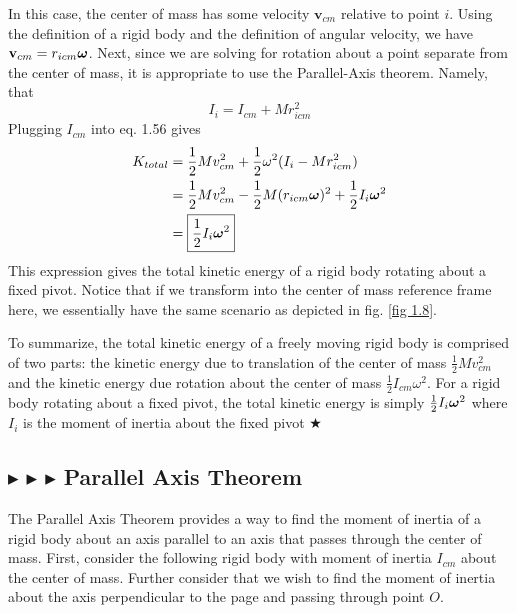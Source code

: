 \noindent In this case, the center of mass has some velocity $\mathbf{v}_{cm}$ relative to point $i$. Using the definition of a rigid body and the definition of angular velocity, we have $\mathbf{v}_{cm} = r_{icm} \boldsymbol{\omega}$. Next, since we are solving for rotation about a point separate from the center of mass, it is appropriate to use the Parallel-Axis theorem. Namely, that
\begin{equation}
    I_i = I_{cm} + Mr_{icm}^2
\end{equation}
\noindent Plugging $I_{cm}$ into eq. 1.56 gives
\begin{align}
    K_{total} &= \frac12 M v_{cm}^2 + \frac12 \omega^2 (I_i - Mr_{icm}^2) \nonumber \\
    &= \frac12 M v_{cm}^2 - \frac12 M (r_{icm} \boldsymbol{\omega})^2 + \frac12 I_i \boldsymbol{\omega}^2 \nonumber \\
    &= \boxed{\frac12 I_i \boldsymbol{\omega}^2}
\end{align}
\noindent This expression gives the total kinetic energy of a rigid body rotating about a fixed pivot. Notice that if we transform into the center of mass reference frame here, we essentially have the same scenario as depicted in fig. \ref{fig 1.8}.

\noindent To summarize, the total kinetic energy of a freely moving rigid body is comprised of two parts: the kinetic energy due to translation of the center of mass $\frac12 M v_{cm}^2$ and the kinetic energy due rotation about the center of mass $\frac12 I_{cm} \omega^2$. For a rigid body rotating about a fixed pivot, the total kinetic energy is simply $\frac12 I_i \boldsymbol{\omega}^2$ where $I_i$ is the moment of inertia about the fixed pivot $\bigstar$

%
%
\subsection{\color{PineGreen} $\blacktriangleright$ \color{Goldenrod} $\blacktriangleright$ \color{Orchid} $\blacktriangleright$ \color{black} Parallel Axis Theorem}\label{1.4.3}
The Parallel Axis Theorem provides a way to find the moment of inertia of a rigid body about an axis parallel to an axis that passes through the center of mass. First, consider the following rigid body with moment of inertia $I_{cm}$ about the center of mass. Further consider that we wish to find the moment of inertia about the axis perpendicular to the page and passing through point $O$.

